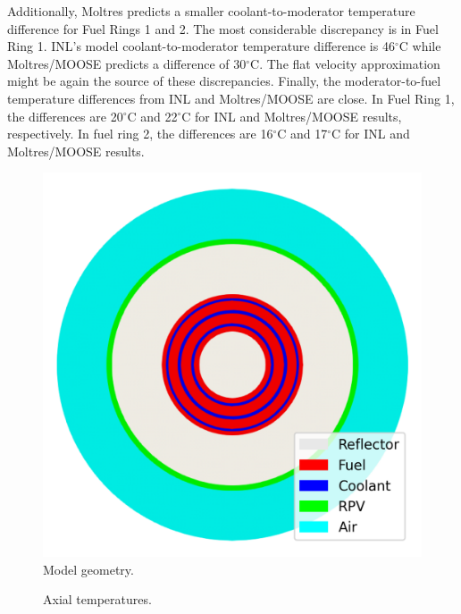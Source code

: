 Additionally, Moltres predicts a smaller coolant-to-moderator temperature difference for Fuel Rings 1 and 2.
The most considerable discrepancy is in Fuel Ring 1.
INL's model coolant-to-moderator temperature difference is 46$^{\circ}$C while Moltres/MOOSE predicts a difference of 30$^{\circ}$C.
The flat velocity approximation might be again the source of these discrepancies.
Finally, the moderator-to-fuel temperature differences from INL and Moltres/MOOSE are close.
In Fuel Ring 1, the differences are 20$^{\circ}$C and 22$^{\circ}$C for INL and Moltres/MOOSE results, respectively.
In fuel ring 2, the differences are 16$^{\circ}$C and 17$^{\circ}$C for INL and Moltres/MOOSE results.

\begin{figure}[htbp!]
  \centering
  \includegraphics[width=0.4\linewidth]{figures-thermal/ex2a-meshC2}
  \hfill
  \caption{Model geometry.}
  \label{fig:ex2a-2nd-model}
\end{figure}

\begin{figure}[htbp!]
  \centering
  \hfill
  \caption{Axial temperatures.}
  \label{fig:ex2a-temps}
\end{figure}

